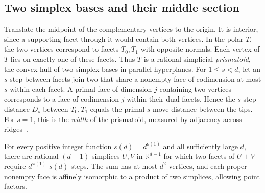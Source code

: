 \subsection{Two simplex bases and their middle section}

Translate the midpoint of the complementary vertices to the origin.
It is interior, since a supporting facet through it would contain both
vertices. In the polar $T$, the two vertices correspond to facets
$T_0,T_1$ with opposite normals. Each vertex of $T$ lies on exactly one
of these facets. Thus $T$ is a rational simplicial \emph{prismatoid},
the convex hull of two simplex bases in parallel hyperplanes. For
$1\le s<d$, let an $s$-step between facets join two that share a nonempty
face of codimension at most $s$ within each facet. A primal face of
dimension $j$ containing two vertices corresponds to a face of
codimension $j$ within their dual facets. Hence the $s$-step distance
$D_s$ between $T_0,T_1$ equals the primal $s$-move distance between
the tips. For $s=1$, this is the \emph{width} of the prismatoid, measured
by adjacency across ridges~\cite{santos}.

\begin{corollary}\label{cor:minkowski}
For every positive integer function $s(d)=d^{o(1)}$ and all sufficiently
large $d$, there are rational $(d-1)$-simplices $U,V$ in
$\mathbb R^{d-1}$ for which two facets of $U+V$ require $d^{\omega(1)}$
$s(d)$-steps. The sum has at most $d^2$ vertices, and each proper
nonempty face is affinely isomorphic to a product of two simplices,
allowing point factors.
\end{corollary}

